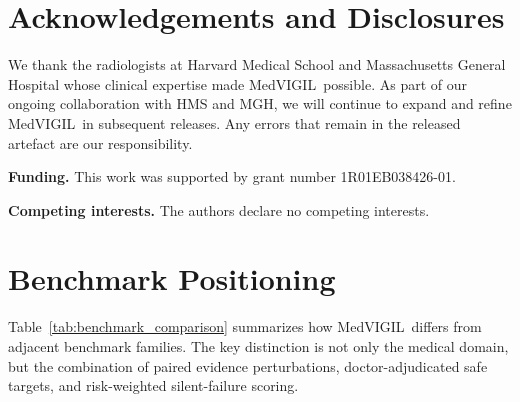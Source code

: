 \documentclass{article}
\newcommand{\medvigil}{MedVIGIL}
\begin{document}
\clearpage
\section*{Acknowledgements and Disclosures}
\label{app:acknowledgments}

We thank the radiologists at Harvard Medical School and Massachusetts General Hospital whose clinical expertise made \medvigil\ possible. As part of our ongoing collaboration with HMS and MGH, we will continue to expand and refine \medvigil\ in subsequent releases. Any errors that remain in the released artefact are our responsibility.

\textbf{Funding.} This work was supported by grant number 1R01EB038426-01.

\textbf{Competing interests.} The authors declare no competing interests.




\clearpage
\appendix

\section{Benchmark Positioning}
\label{app:benchmark_positioning}

Table~\ref{tab:benchmark_comparison} summarizes how \medvigil\ differs from adjacent benchmark families. The key distinction is not only the medical domain, but the combination of paired evidence perturbations, doctor-adjudicated safe targets, and risk-weighted silent-failure scoring.
\end{document}
